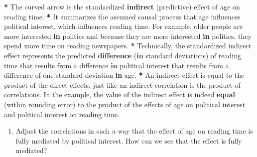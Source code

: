 \documentclass[a4paper]{book}
\newenvironment{Shaded}{\begin{snugshade}}{\end{snugshade}}
\newcommand{\KeywordTok}[1]{\textcolor[rgb]{0,0,0}{\textbf{#1}}}
\newcommand{\StringTok}[1]{\textcolor[rgb]{0.00,0.00,0.00}{#1}}
\newcommand{\ControlFlowTok}[1]{\textcolor[rgb]{0.00,0.00,0.00}{\textbf{#1}}}
\newcommand{\OperatorTok}[1]{\textcolor[rgb]{0.00,0.00,0.00}{\textbf{#1}}}
\newcommand{\NormalTok}[1]{#1}
\providecommand{\tightlist}{%
  \setlength{\itemsep}{0pt}\setlength{\parskip}{0pt}}
\theoremstyle{definition}
\theoremstyle{definition}
\theoremstyle{definition}
\theoremstyle{remark}
\begin{document}
\begin{Shaded}
\begin{Highlighting}[]
\OperatorTok{*}\StringTok{ }\NormalTok{The curved arrow is the standardized }\KeywordTok{indirect}\NormalTok{ (predictive) effect of age on}
\NormalTok{reading time.}
\OperatorTok{*}\StringTok{ }\NormalTok{It summarizes the assumed causal process that age influences political}
\NormalTok{interest, which influences reading time. For example, older people are more}
\NormalTok{interested }\ControlFlowTok{in}\NormalTok{ politics and because they are more interested }\ControlFlowTok{in}\NormalTok{ politics, they}
\NormalTok{spend more time on reading newspapers.}
\OperatorTok{*}\StringTok{ }\NormalTok{Technically, the standardized indirect effect represents the predicted}
\KeywordTok{difference}\NormalTok{ (}\ControlFlowTok{in}\NormalTok{ standard deviations) of reading time that results from a}
\NormalTok{difference }\ControlFlowTok{in}\NormalTok{ political interest that results from a difference of one}
\NormalTok{standard deviation }\ControlFlowTok{in}\NormalTok{ age.}
\OperatorTok{*}\StringTok{ }\NormalTok{An indirect effect is equal to the product of the direct effects, just like}
\NormalTok{an indirect correlation is the product of correlations. In the example, the}
\NormalTok{value of the indirect effect is indeed }\KeywordTok{equal}\NormalTok{ (within rounding error) to the}
\NormalTok{product of the effects of age on political interest and political interest on}
\NormalTok{reading time.}
\end{Highlighting}
\end{Shaded}

\begin{enumerate}
\def\labelenumi{\arabic{enumi}.}
\setcounter{enumi}{2}
\tightlist
\item
  Adjust the correlations in such a way that the effect of age on
  reading time is fully mediated by political interest. How can we see
  that the effect is fully mediated?
\end{enumerate}
\end{document}
